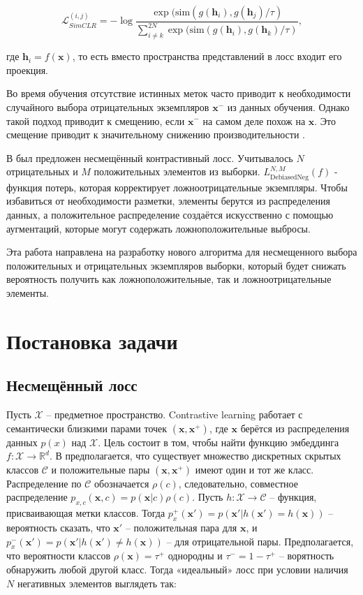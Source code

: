 \documentclass[a4paper, 12pt]{article}
\begin{document}
\[\mathcal{L}_{SimCLR}^{(i, j)} = - \log\frac{\exp(\text{sim}(g(\mathbf{h}_i), g(\mathbf{h}_j) / \tau)}{\sum\limits_{i \neq k}^{2N}\exp(\text{sim}(g(\mathbf{h}_i), g(\mathbf{h}_k) / \tau)},\]

\noindent где $\mathbf{h}_i = f(\mathbf{x})$, то есть вместо пространства представлений в лосс входит его проекция.

Во время обучения отсутствие истинных меток часто приводит к необходимости случайного выбора отрицательных экземпляров $\mathbf{x}^-$ из данных обучения. Однако такой подход приводит к смещению, если $\mathbf{x}^-$ на самом деле похож на $\mathbf{x}$. Это смещение приводит к значительному снижению производительности \citep{NEURIPS2021_de8aa43e}.

В \citep{chuang2020debiased} был предложен несмещённый контрастивный лосс. Учитывалось $N$ отрицательных и $M$ положительных элементов из выборки. $L^{N, M}_{\text{DebiasedNeg}}(f)$ - функция потерь, которая корректирует ложноотрицательные экземпляры. Чтобы избавиться от необходимости разметки, элементы берутся из распределения данных, а положительное распределение создаётся искусственно с помощью аугментаций, которые могут содержать ложноположительные выбросы.

Эта работа направлена на разработку нового алгоритма для несмещенного выбора положительных и отрицательных экземпляров выборки, который будет снижать вероятность получить как ложноположительные, так и ложноотрицательные элементы.

\section{Постановка задачи}

\subsection{Несмещённый лосс}

Пусть $\mathcal{X}$ -- предметное пространство. Contrastive learning работает с семантически близкими парами точек $(\mathbf{x}, \mathbf{x}^+)$, где $\mathbf{x}$ берётся из распределения данных $p(x)$ над $\mathcal{X}$. Цель состоит в том, чтобы найти функцию эмбеддинга $f: \mathcal{X} \rightarrow \mathbb{R}^d$. В \citep{chuang2020debiased} предполагается, что существует множество дискретных скрытых классов $\mathcal{C}$ и положительные пары $(\mathbf{x}, \mathbf{x}^+)$ имеют один и тот же класс. Распределение по $\mathcal{C}$ обозначается $\rho(c)$, следовательно, совместное
распределение $p_{x,c}(\textbf{x}, c) = p(\textbf{x}|c)\rho(c)$. Пусть $h : \mathcal{X} \rightarrow \mathcal{C}$ -- функция, присваивающая метки классов. Тогда $p^+_x(\textbf{x}') = p(\textbf{x}'|h(\textbf{x}') = h(\textbf{x}))$ -- вероятность сказать, что $\textbf{x}'$ -- положительная пара для $\textbf{x}$, и $p^-_x(\textbf{x}') = p(\textbf{x}'|h(\textbf{x}') \neq h(\textbf{x}))$ -- для отрицательной пары. Предполагается, что вероятности классов $\rho(\textbf{x}) = \tau^+$ однородны и $\tau^- = 1 - \tau^+$ -- ворятность обнаружить любой другой класс. Тогда «идеальный» лосс при условии наличия $N$ негативных элементов выглядеть так:
\end{document}
